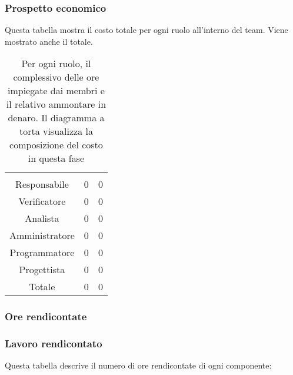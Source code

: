 \subsubsection{Prospetto economico}
Questa tabella mostra il costo totale per ogni ruolo all'interno del team. Viene mostrato anche il totale.

\begin{table}[H]
{\setlength{\parindent}{0cm}
\begin{minipage}{.43\textwidth}
	\begin{tabular}{ccc}
	\rowcolorhead
	\headertitle{Ruolo} & \headertitle{Ore} & \headertitle{Costo(€)}\\
	Responsabile & 0 & 0\\
	Verificatore & 0 & 0\\
	Analista & 0 & 0\\
	Amministratore & 0 & 0\\
	Programmatore & 0 & 0\\
	Progettista & 0 & 0\\
	\hline
	Totale & 0& 0\\
	\end{tabular}
\end{minipage}%
\begin{minipage}{.57\textwidth}
\end{minipage} }
\caption{Per ogni ruolo, il complessivo delle ore impiegate dai membri e il relativo ammontare in denaro. Il diagramma a torta visualizza la composizione del costo in questa fase}
\end{table}



\subsubsection{Ore rendicontate}
\subsubsection{Lavoro rendicontato}
Questa tabella descrive il numero di ore rendicontate di ogni componente:

